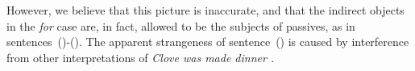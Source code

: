 
However, we believe that this picture is inaccurate, and that the indirect
objects in the {\it for} case are, in fact, allowed to be the subjects of
passives, as in sentences~()-().  The apparent strangeness of
sentence~() is caused by interference from other interpretations of {\it
Clove was made dinner .}







